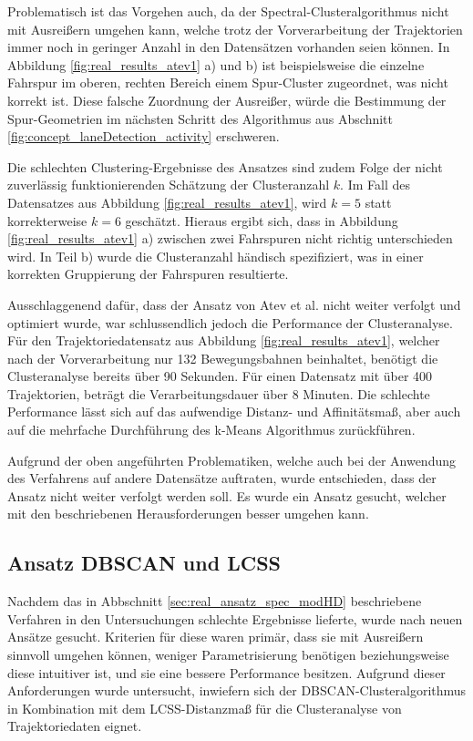 Problematisch ist das Vorgehen auch, da der Spectral-Clusteralgorithmus nicht mit Ausreißern umgehen kann,
welche trotz der Vorverarbeitung der Trajektorien immer noch in geringer Anzahl in den Datensätzen vorhanden seien können.
In Abbildung \ref{fig:real_results_atev1} a) und b) ist beispielsweise die einzelne Fahrspur im oberen, rechten Bereich
einem Spur-Cluster zugeordnet, was nicht korrekt ist.
Diese falsche Zuordnung der Ausreißer, würde die Bestimmung der Spur-Geometrien im nächsten Schritt des
Algorithmus aus Abschnitt \ref{fig:concept_laneDetection_activity} erschweren.

Die schlechten Clustering-Ergebnisse des Ansatzes sind zudem Folge der nicht zuverlässig funktionierenden Schätzung
der Clusteranzahl $k$. Im Fall des Datensatzes aus Abbildung \ref{fig:real_results_atev1}, wird $k = 5$
statt korrekterweise $k = 6$ geschätzt. Hieraus ergibt sich, dass in Abbildung \ref{fig:real_results_atev1} a)
zwischen zwei Fahrspuren nicht richtig unterschieden wird. In Teil b) wurde die Clusteranzahl händisch spezifiziert,
was in einer korrekten Gruppierung der Fahrspuren resultierte.

Ausschlaggenend dafür, dass der Ansatz von Atev et al. nicht weiter verfolgt und optimiert wurde, war schlussendlich
jedoch die Performance der Clusteranalyse. Für den Trajektoriedatensatz aus Abbildung \ref{fig:real_results_atev1},
welcher nach der Vorverarbeitung nur 132 Bewegungsbahnen beinhaltet, benötigt die Clusteranalyse bereits über
90 Sekunden. Für einen Datensatz mit über 400 Trajektorien, beträgt die Verarbeitungsdauer über 8 Minuten.
Die schlechte Performance lässt sich auf das aufwendige Distanz- und Affinitätsmaß, aber auch auf die mehrfache
Durchführung des k-Means Algorithmus zurückführen.

Aufgrund der oben angeführten Problematiken, welche auch bei der Anwendung des Verfahrens auf andere Datensätze auftraten,
wurde entschieden, dass der Ansatz nicht weiter verfolgt werden soll.
Es wurde ein Ansatz gesucht, welcher mit den beschriebenen Herausforderungen besser umgehen kann.

\subsection{Ansatz DBSCAN und LCSS}
\label{sec:real_ansatz_dbscan_lcss}

Nachdem das in Abbschnitt \ref{sec:real_ansatz_spec_modHD} beschriebene Verfahren in
den Untersuchungen schlechte Ergebnisse lieferte, wurde nach neuen Ansätze gesucht.
Kriterien für diese waren primär, dass sie mit Ausreißern sinnvoll umgehen können, weniger Parametrisierung
benötigen beziehungsweise diese intuitiver ist, und sie eine bessere Performance besitzen.
Aufgrund dieser Anforderungen wurde untersucht, inwiefern sich der DBSCAN-Clusteralgorithmus
in Kombination mit dem LCSS-Distanzmaß für die Clusteranalyse von Trajektoriedaten eignet.

